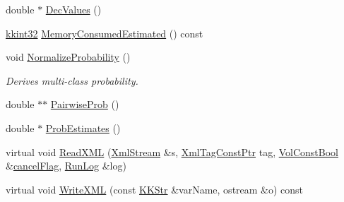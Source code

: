 \begin{DoxyCompactItemize}
\item 
double $\ast$ \hyperlink{struct_s_v_m289___m_f_s_1_1_svm___model_a534342f92ec4b972b5c1321025223a0f}{Dec\+Values} ()
\item 
\hyperlink{namespace_k_k_b_a8fa4952cc84fda1de4bec1fbdd8d5b1b}{kkint32} \hyperlink{struct_s_v_m289___m_f_s_1_1_svm___model_a126416e9c696cc6b2f63cabbb84abb98}{Memory\+Consumed\+Estimated} () const 
\item 
void \hyperlink{struct_s_v_m289___m_f_s_1_1_svm___model_a130c243047236acbfbe4005416de39a1}{Normalize\+Probability} ()
\begin{DoxyCompactList}\small\item\em Derives multi-\/class probability. \end{DoxyCompactList}\item 
double $\ast$$\ast$ \hyperlink{struct_s_v_m289___m_f_s_1_1_svm___model_a0e4118b531080a8e860b76d4eadcfd80}{Pairwise\+Prob} ()
\item 
double $\ast$ \hyperlink{struct_s_v_m289___m_f_s_1_1_svm___model_ae167af415613364d71e69cbd4221d4d3}{Prob\+Estimates} ()
\item 
virtual void \hyperlink{struct_s_v_m289___m_f_s_1_1_svm___model_a8fa172f2ade18ea362185452644c1754}{Read\+X\+ML} (\hyperlink{class_k_k_b_1_1_xml_stream}{Xml\+Stream} \&s, \hyperlink{namespace_k_k_b_a5f1b0b1667d79fec26deeff10c43df23}{Xml\+Tag\+Const\+Ptr} tag, \hyperlink{namespace_k_k_b_a7d390f568e2831fb76b86b56c87bf92f}{Vol\+Const\+Bool} \&\hyperlink{struct_s_v_m289___m_f_s_1_1_svm___model_a01645368f6800875543d69ce8731d692}{cancel\+Flag}, \hyperlink{class_k_k_b_1_1_run_log}{Run\+Log} \&log)
\item 
virtual void \hyperlink{struct_s_v_m289___m_f_s_1_1_svm___model_ac0547f02f0aa730420892f4a7897d636}{Write\+X\+ML} (const \hyperlink{class_k_k_b_1_1_k_k_str}{K\+K\+Str} \&var\+Name, ostream \&o) const 
\end{DoxyCompactItemize}

